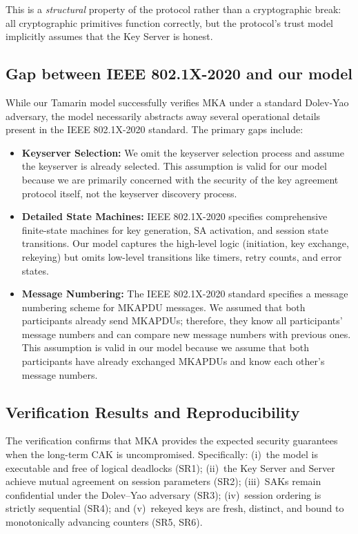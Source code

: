 This is a \emph{structural} property of the protocol rather than a cryptographic break: all cryptographic primitives function correctly, but the protocol's trust model implicitly assumes that the Key Server is honest.

\subsection{Gap between IEEE 802.1X-2020 and our model}

\begin{sloppypar}
While our Tamarin model successfully verifies MKA under a standard Dolev-Yao adversary, the model necessarily abstracts away several operational details present in the IEEE 802.1X-2020 standard. The primary gaps include:
\begin{itemize}
    \item \textbf{Keyserver Selection:} We omit the keyserver selection process and assume the keyserver is already selected. This assumption is valid for our model because we are primarily concerned with the security of the key agreement protocol itself, not the keyserver discovery process. 
    \item \textbf{Detailed State Machines:} IEEE 802.1X-2020 specifies comprehensive finite-state machines for key generation, SA activation, and session state transitions. Our model captures the high-level logic (initiation, key exchange, rekeying) but omits low-level transitions like timers, retry counts, and error states.
    \item \textbf{Message Numbering:} The IEEE 802.1X-2020 standard specifies a message numbering scheme for MKAPDU messages. We assumed that both participants already send MKAPDUs; therefore, they know all participants' message numbers and can compare new message numbers with previous ones. This assumption is valid in our model because we assume that both participants have already exchanged MKAPDUs and know each other's message numbers.
\end{itemize}
\end{sloppypar}

\subsection{Verification Results and Reproducibility}

The verification confirms that MKA provides the expected security guarantees when the long-term CAK is uncompromised. Specifically: (i)~the model is executable and free of logical deadlocks (SR1); (ii)~the Key Server and Server achieve mutual agreement on session parameters (SR2); (iii)~SAKs remain confidential under the Dolev--Yao adversary (SR3); (iv)~session ordering is strictly sequential (SR4); and (v)~rekeyed keys are fresh, distinct, and bound to monotonically advancing counters (SR5, SR6).


